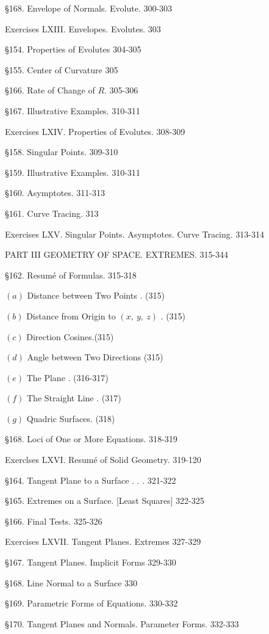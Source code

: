 \documentclass[12pt]{article}
\begin{document}
\S 168. Envelope of Normals. Evolute. 300-303

Exercises LXIII. Envelopes. Evolutes. 303

\S 154. Properties of Evolutes 304-305

\S 155. Center of Curvature 305

\S 166. Rate of Change of $R$. 305-306

\S 167. Illustrative Examples. 310-311

Exercises LXIV. Properties of Evolutes. 308-309

\S 158. Singular Points. 309-310

\S 159. Illustrative Examples. 310-311

\S 160. Asymptotes. 311-313

\S 161. Curve Tracing. 313

Exercises LXV. Singular Points. Asymptotes. Curve Tracing. 313-314

PART III GEOMETRY OF SPACE. EXTREMES. 315-344

\S 162. Resum\'{e} of Formulas. 315-318

$(a)$ Distance between Two Points . (315)

$(b)$  Distance from Origin to $(x,\ y,\ z)$ . (315)

$(c)$ Direction Cosines.(315)

$(d)$ Angle between Two Directions (315)

$(e)$ The Plane . (316-317)

$(f)$ The Straight Line . (317)

$(g)$ Quadric Surfaces. (318)

\S 168. Loci of One or More Equations. 318-319

Exerclses LXVI. Resum\'{e} of Solid Geometry. 319-120


\S 164. Tangent Plane to a Surface . . . 321-322

\S 165. Extremes on a Surface. [Least Squares] 322-325

\S 166. Final Tests. 325-326

Exercises LXVII. Tangent Planes. Extremes 327-329

\S 167. Tangent Planes. Implicit Forms 329-330

\S 168. Line Normal to a Surface 330

\S 169. Parametric Forms of Equations. 330-332

\S 170. Tangent Planes and Normals. Parameter Forms. 332-333
\end{document}
